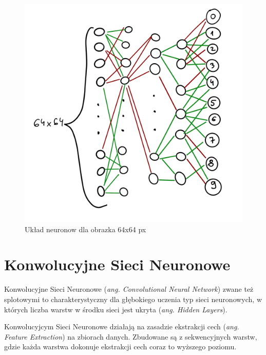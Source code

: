 \documentclass[brudnopis]{xmgr}
\begin{document}
\begin{figure}[!tbh]
\centering
\includegraphics[width=.8\hsize]{fig/2}
\caption{Układ neuronow dla obrazka 64x64 px\label{RYS.2}}
\end{figure}


\section{Konwolucyjne Sieci Neuronowe  \label{s:dsssl}}


Konwolucyjne Sieci Neuronowe (\textit{ang. Convolutional Neural Network}) zwane też splotowymi to charakterystyczny dla głębokiego uczenia typ sieci neuronowych, w których liczba warstw w środku sieci jest ukryta (\textit{ang. Hidden Layers}).

Konwolucyjcym Sieci Neuronowe działają na zasadzie ekstrakcji cech (\textit{ang. Feature Extraction}) na zbiorach danych. Zbudowane są z sekwencyjnych warstw, gdzie każda warstwa dokonuje ekstrakcji cech coraz to wyższego poziomu.
\end{document}
